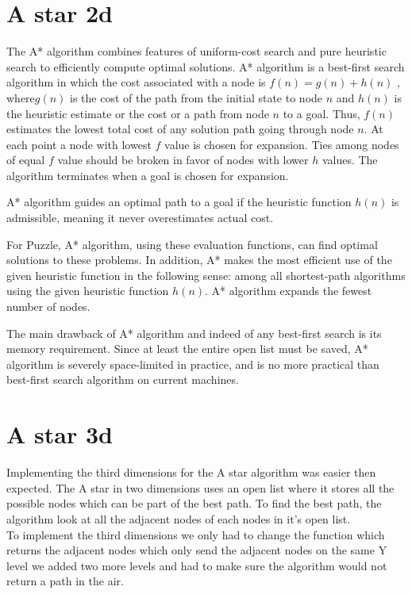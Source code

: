 \documentclass[article]{report}             %
\begin{document}
			\section{A star 2d}
				The A* algorithm combines features of uniform-cost search and pure heuristic search to efficiently compute optimal solutions. A* algorithm is a best-first search algorithm in which the cost associated with a node is $ f (n) = g(n) + h(n) $ , where$  g(n) $  is the cost of the path from the initial state to node $ n $ and $ h(n) $ is the heuristic estimate or the cost or a path from node $ n $ to a goal. Thus, $ f(n) $ estimates the lowest total cost of any solution path going through node $ n $. At each point a node with lowest $ f $ value is chosen for expansion. Ties among nodes of equal $ f $ value should be broken in favor of nodes with lower $ h $ values. The algorithm terminates when a goal is chosen for expansion.

A* algorithm guides an optimal path to a goal if the heuristic function $ h(n) $ is admissible, meaning it never overestimates actual cost.

For Puzzle, A* algorithm, using these evaluation functions, can find optimal solutions to these problems. In addition, A* makes the most efficient use of the given heuristic function in the following sense: among all shortest-path algorithms using the given heuristic function $ h(n) $. A* algorithm expands the fewest number of nodes.

The main drawback of A* algorithm and indeed of any best-first search is its memory requirement. Since at least the entire open list must be saved, A* algorithm is severely space-limited in practice, and is no more practical than best-first search algorithm on current machines. \\
			\section{A star 3d}
				Implementing the third dimensions for the A star algorithm was easier then expected. The A star in two dimensions uses an open list where it stores all the possible nodes which can be part of the best path. To find the best path, the algorithm look at all the adjacent nodes of each nodes in it's open list.\\

				To implement the third dimensions we only had to change the function which returns the adjacent nodes which only send the adjacent nodes on the same Y level we added two more levels and had to make sure the algorithm would not return a  path in the air.
				
\end{document}
